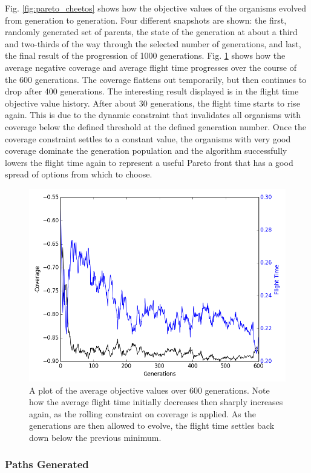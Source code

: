 \documentclass[letterpaper, 10 pt, conference]{ieeeconf}  %
\begin{document}
Fig. \ref{fig:pareto_cheetos} shows how the objective values of the organisms evolved from generation to generation. Four different snapshots are shown: the first, randomly generated set of parents, the state of the generation at about a third and two-thirds of the way through the selected number of generations, and last, the final result of the progression of 1000 generations. Fig. \ref{fig:objectives} shows how the average negative coverage and average flight time progresses over the course of the 600 generations. The coverage flattens out temporarily, but then continues to drop after 400 generations. The interesting result displayed is in the flight time objective value history. After about 30 generations, the flight time starts to rise again. This is due to the dynamic constraint that invalidates all organisms with coverage below the defined threshold at the defined generation number. Once the coverage constraint settles to a constant value, the organisms with very good coverage dominate the generation population and the algorithm successfully lowers the flight time again to represent a useful Pareto front that has a good spread of options from which to choose.

\begin{figure}
\centering
\includegraphics[width=0.8\linewidth]{figures/fitness.png}
\caption{A plot of the average objective values over 600 generations. Note how the average flight time initially decreases then sharply increases again, as the rolling constraint on coverage is applied. As the generations are then allowed to evolve, the flight time settles back down below the previous minimum.}
\label{fig:objectives}
\end{figure}

\subsubsection{Paths Generated}
\end{document}
